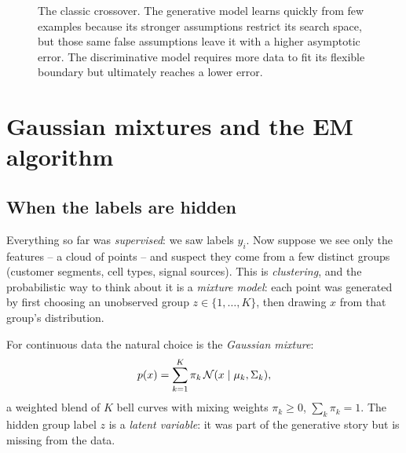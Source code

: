 \begin{figure}[H]
\centering
{}
\caption{The classic crossover. The generative model learns quickly from few examples because its stronger assumptions restrict its search space, but those same false assumptions leave it with a higher asymptotic error. The discriminative model requires more data to fit its flexible boundary but ultimately reaches a lower error.}
\label{ch34:fig-ng-jordan}
\end{figure}

\section{Gaussian mixtures and the EM algorithm}
\label{ch34:gmm-em}

\subsection{When the labels are hidden}

Everything so far was \emph{supervised}: we saw labels $y_i$. Now suppose we see
only the features -- a cloud of points -- and suspect they come from a few distinct
groups (customer segments, cell types, signal sources). This is
\emph{clustering}, and the probabilistic way to think about it is a
\emph{mixture model}: each point was generated by first choosing an unobserved group
$z\in\{1,\dots,K\}$, then drawing $x$ from that group's distribution.

For continuous data the natural choice is the \emph{Gaussian mixture}:
\[
  p(x) = \sum_{k=1}^K \pi_k\,\mathcal{N}(x \mid \mu_k, \Sigma_k),
\]
a weighted blend of $K$ bell curves with mixing weights $\pi_k \ge 0$,
$\sum_k\pi_k = 1$. The hidden group label $z$ is a \emph{latent variable}: it was
part of the generative story but is missing from the data.

